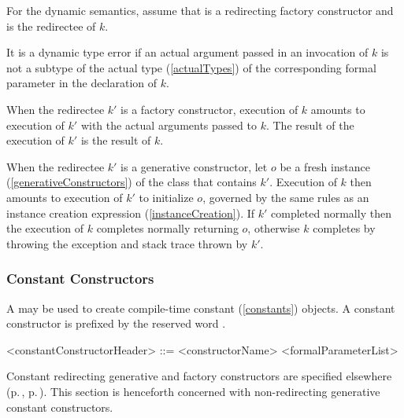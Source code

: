 \documentclass[makeidx]{article}
\begin{document}
\LMHash{}%
For the dynamic semantics,
assume that  is a redirecting factory constructor
and  is the redirectee of $k$.

\LMHash{}%
It is a dynamic type error if an actual argument passed in an invocation of $k$
is not a subtype of the actual type (\ref{actualTypes})
of the corresponding formal parameter in the declaration of $k$.

\LMHash{}%
When the redirectee $k'$ is a factory constructor,
execution of $k$ amounts to execution of $k'$
with the actual arguments passed to $k$.
The result of the execution of $k'$ is the result of $k$.

\LMHash{}%
When the redirectee $k'$ is a generative constructor,
let $o$ be a fresh instance (\ref{generativeConstructors})
of the class that contains $k'$.
Execution of $k$ then amounts to execution of $k'$ to initialize $o$,
governed by the same rules as an instance creation expression
(\ref{instanceCreation}).
If $k'$ completed normally then the execution of $k$
completes normally returning $o$,
otherwise $k$ completes by throwing the exception and stack trace
thrown by $k'$.


\subsubsection{Constant Constructors}

\LMHash{}%
A 
may be used to create compile-time constant (\ref{constants}) objects.
A constant constructor is prefixed by the reserved word \CONST.

\begin{grammar}
<constantConstructorHeader> ::= \gnewline{}
  \CONST{} <constructorName> <formalParameterList>
\end{grammar}


\LMHash{}%
Constant redirecting generative and factory constructors are specified elsewhere
(p.\,\pageref{redirectingGenerativeConstructors},
p.\,\pageref{redirectingFactoryConstructors}).
This section is henceforth concerned with
non-redirecting generative constant constructors.
\end{document}
